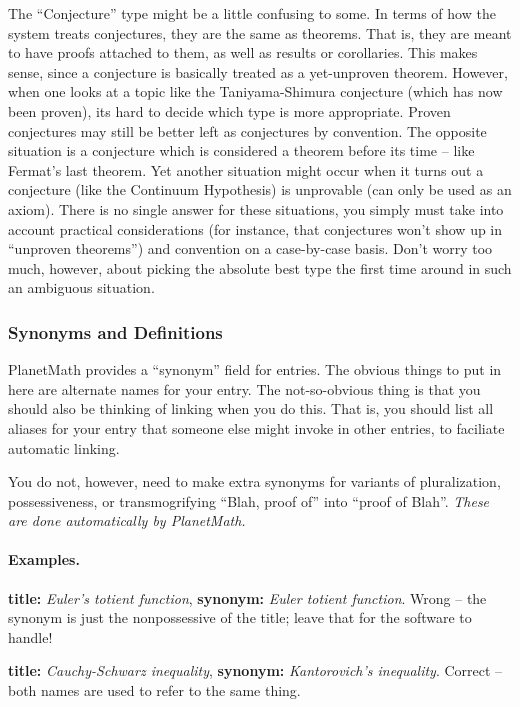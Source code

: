The ``Conjecture'' type might be a little confusing to some. In terms
of how the system treats conjectures, they are the same as
theorems. That is, they are meant to have proofs attached to them, as
well as results or corollaries. This makes sense, since a conjecture
is basically treated as a yet-unproven theorem. However, when one
looks at a topic like the Taniyama-Shimura conjecture (which has now
been proven), its hard to decide which type is more
appropriate. Proven conjectures may still be better left as
conjectures by convention. The opposite situation is a conjecture
which is considered a theorem before its time -- like Fermat's last
theorem. Yet another situation might occur when it turns out a
conjecture (like the Continuum Hypothesis) is unprovable (can only be
used as an axiom). There is no single answer for these situations, you
simply must take into account practical considerations (for instance,
that conjectures won't show up in ``unproven theorems'') and
convention on a case-by-case basis. Don't worry too much, however,
about picking the absolute best type the first time around in such an
ambiguous situation.

\subsubsection*{Synonyms and Definitions}
PlanetMath provides a ``synonym'' field for entries. The obvious
things to put in here are alternate names for your entry. The
not-so-obvious thing is that you should also be thinking of linking
when you do this. That is, you should list all aliases for your entry
that someone else might invoke in other entries, to faciliate
automatic linking.

You do not, however, need to make extra synonyms for variants of
pluralization, possessiveness, or transmogrifying ``Blah, proof of''
into ``proof of Blah''. \emph{These are done automatically by
PlanetMath.}

\paragraph{Examples.}
{\bf title:} \emph{Euler's totient function}, {\bf synonym:}
\emph{Euler totient function}. Wrong -- the synonym is just the
nonpossessive of the title; leave that for the software to handle!

{\bf title:} \emph{Cauchy-Schwarz inequality}, {\bf synonym:} \emph{Kantorovich's inequality}.
Correct -- both names are used to refer to the same thing.

